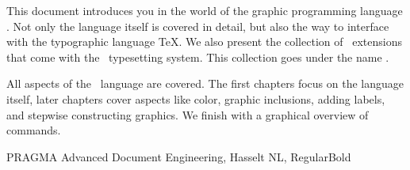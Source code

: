 \startbuffer[backtext]

    This document introduces you in the world of the graphic programming language
    \MetaPost. Not only the language itself is covered in detail, but also the way to
    interface with the typographic language \TeX. We also present the collection of
    \MetaPost\ extensions that come with the \ConTeXt\ typesetting system. This
    collection goes under the name \MetaFun.

    \blank

    All aspects of the \MetaPost\ language are covered. The first chapters focus on
    the language itself, later chapters cover aspects like color, graphic
    inclusions, adding labels, and stepwise constructing graphics. We finish with a
    graphical overview of commands.

\stopbuffer

\startbuffer[backbanner]

  \WidthSpanningText
    {PRAGMA Advanced Document Engineering, Hasselt NL, \currentdate[year]}
    {\hsize}
    {RegularBold}

\stopbuffer

\stopenvironment
